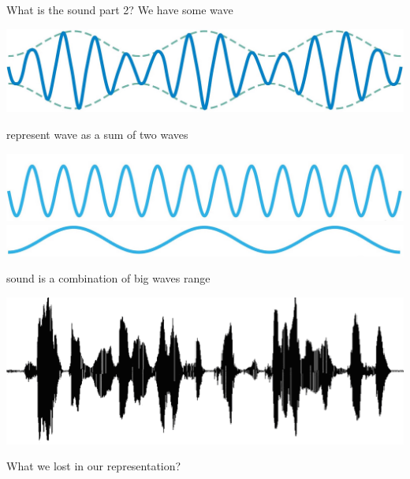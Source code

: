 \documentclass{beamer}
\begin{document}
\begin{frame}{What is the sound part 2?} 
	We have some wave 
	
		\begin{center}
			\includegraphics[scale=0.1]{img/wave1}
		\end{center}
		
	represent wave as a sum of two waves 
	
		\begin{center}
			\includegraphics[scale=0.1]{img/wave2}
			\includegraphics[scale=0.1]{img/wave3}
		\end{center}
	
	sound is a combination of big waves range
	
		\begin{center}
			\includegraphics[scale=0.4]{img/sound_}
		\end{center}
	
	\begin{center}
		What we lost in our representation?
	\end{center}	
\end{frame}
\end{document}
